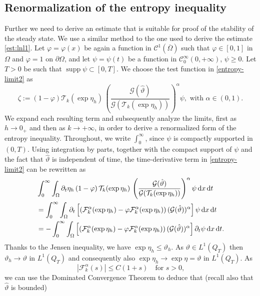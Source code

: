 \documentclass[11pt, a4paper, reqno]{amsart}
\numberwithin{equation}{section}
\DeclareMathOperator*{\supp}{supp}
\newcommand{\dert}{\partial_t}
\newcommand{\thetah}{\hat\thet}
\newcommand{\thet}{\vartheta}
\newcommand{\dt}{\,{\rm d} t }
\newcommand{\dx}{\,{\rm d} {x}}
\newcommand{\G}{\mathcal{G}}
\newcommand{\al}{\alpha}
\newcommand{\intnO}[1]{\int_0^{\infty}\intO{ #1 }\dt}
\newcommand{\intO}[1]{\int_{\Omega} #1 \dx}
\begin{document}
\subsection{Renormalization of the entropy inequality}\label{SectEntrop}
Further we need to derive an estimate that is suitable for proof of the stability of the steady state. We use a similar method to the one used to derive the estimate \eqref{est:lnl1}. 
Let $\varphi=\varphi(x)$ be again a function in $\mathcal{C}^1(\overline\Omega)$ such that $\varphi\in[0,1]$ in $\Omega$ and $\varphi=1$ on $\partial \Omega$, and let $\psi=\psi(t)$ be a function in $\mathcal{C}^\infty_0(0, +\infty)$, $\psi\geq 0$. Let $T>0$ be such that $\supp\psi\subset[0,T]$. We choose the test function in \eqref{entropy-limit2} as 
$$
\zeta:=(1-\varphi) \mathcal{T}_k(\exp{\eta_h})\, \left(\frac{\G(\thetah)}{\G(\mathcal{T}_k(\exp{\eta_h}))}\right)^\alpha\psi, \mbox{ with $\alpha\in(0,1)$.}
$$
We expand each resulting term and subsequently analyze the limits, first as $h \to 0_+$ and then as $k \to +\infty$, in order to derive a renormalized form of the entropy inequality.  
Throughout, we write $\int_0^{\infty}$, since $\psi$ is compactly supported in $(0,T)$.  
Using integration by parts, together with the compact support of $\psi$ and the fact that $\thetah$ is independent of time, the time-derivative term in \eqref{entropy-limit2} can be rewritten as
\begin{equation*}\begin{split}
&\intnO{\dert\eta_h \, (1-\varphi)\, \mathcal{T}_k(\exp{\eta_h})\,\left(\frac{\G(\thetah)}{\G(\mathcal{T}_k(\exp{\eta_h}))}\right)^{\al} \psi } \\&= \intnO{\dert\left[\left( \mathcal{F}_k^\al(\exp{\eta_h}) - \varphi\mathcal{F}_k^\al(\exp{\eta_h})\right)(\G(\thetah))^{\al}\right]\psi}\\
&= -\intnO{\left[\left( \mathcal{F}_k^\al(\exp{\eta_h}) - \varphi\mathcal{F}_k^\al(\exp{\eta_h})\right)(\G(\thetah))^{\al}\right]\dert\psi}.
\end{split}\end{equation*}
 Thanks to the Jensen inequality, we have  $\exp \eta_h\leq \thet_h$. As $\thet\in L^{1}(Q_T)$ then $\thet_h \to \thet$ in $L^1(Q_T)$ and consequently also $\exp \eta_h \to \exp \eta =\thet$ in $L^1(Q_T)$. As
\begin{equation}\label{est:forleb}
  |\mathcal{F}_k^{\al}(s)| \le C(1+s)\quad\mbox{for $s>0$,}
\end{equation}
we can use the Dominated Convergence Theorem to deduce that (recall also that $\thetah$ is bounded)
\end{document}
